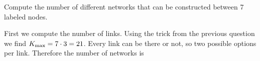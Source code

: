 


Compute the number of different networks that can be constructed between 7 labeled nodes.


\solution
First we compute the number of links. Using the trick from the previous question we find $K_{\rm max}=7 \cdot 3=21$. Every link can be there or not, so two possible options per link. Therefore the number of networks is


